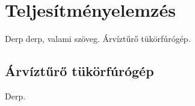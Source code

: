 \chapter{Teljesítményelemzés}
Derp derp, valami szöveg. Árvíztűrő tükörfúrógép.


\section{Árvíztűrő tükörfúrógép}
Derp.



